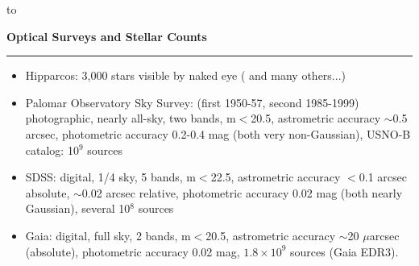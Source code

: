 \documentclass[letterpaper,landscape]{slides}
\begin{document}
\begin{slide}

\hbox to 
\vfill 
\end{slide}




\begin{slide}
\begin{center}
\bfseries
{\large {\color{red} Optical Surveys and Stellar Counts}}
\end{center}
\vskip 0.2in
\hrule

\vskip 0.1in
\begin{itemize}
\item { Hipparcos:} 3,000 stars visible by naked eye ({ and many others...})
\item { Palomar Observatory Sky Survey:} (first 1950-57, second 1985-1999) 
         photographic, nearly all-sky, 
         two bands, m$<$20.5, astrometric accuracy $\sim$0.5 arcsec, photometric
         accuracy 0.2-0.4 mag (both very non-Gaussian), USNO-B catalog: 10$^9$ sources
\item { SDSS:} digital, 1/4 sky, 5 bands, m$<$22.5, astrometric accuracy 
        $<$0.1 arcsec absolute,  $\sim$0.02 arcsec relative, photometric
         accuracy 0.02 mag (both nearly Gaussian), several 10$^8$ sources
\item { Gaia:} digital, full sky, 2 bands, m$<$20.5, astrometric accuracy $\sim$20 $\mu$arcsec (absolute),  photometric accuracy 0.02 mag, $1.8\times 10^9$ sources (Gaia EDR3).
\end{itemize}
\end{slide}
 
\end{document}
